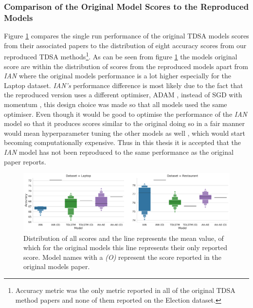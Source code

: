 \subsubsection{Comparison of the Original Model Scores to the Reproduced Models}
Figure \ref{fig:aug_baseline_replication_scores} compares the single run performance of the original TDSA models scores from their associated papers to the distribution of eight accuracy scores from our reproduced TDSA methods\footnote{Accuracy metric was the only metric reported in all of the original TDSA method papers and none of them reported on the Election dataset.}. As can be seen from figure \ref{fig:aug_baseline_replication_scores} the models original score are within the distribution of scores from the reproduced models apart from \textit{IAN} where the original models performance is a lot higher especially for the Laptop dataset. \textit{IAN's} performance difference is most likely due to the fact that the reproduced version uses a different optimiser, ADAM \citep{kingma2014adam}, instead of SGD with momentum \citep{qian1999momentum}, this design choice was made so that all models used the same optimiser. Even though it would be good to optimise the performance of the \textit{IAN} model so that it produces scores similar to the original doing so in a fair manner would mean hyperparameter tuning the other models as well \citep{dodge-etal-2019-show}, which would start becoming computationally expensive. Thus in this thesis it is accepted that the \textit{IAN} model has not been reproduced to the same performance as the original paper reports.

\begin{figure}[ht!]
    \centering
    \includegraphics[scale=0.4]{images/augmentation/methods_performance/baseline/replication_experiment_baseline.pdf}
    \caption{Distribution of all scores and the line represents the mean value, of which for the original models this line represents their only reported score. Model names with a \textit{(O)} represent the score reported in the original models paper.}
    \label{fig:aug_baseline_replication_scores}
\end{figure}


